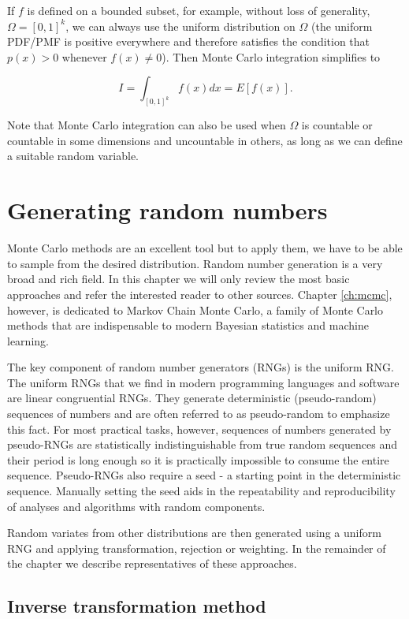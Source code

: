 \documentclass{book}
\theoremstyle{plain}%
\theoremstyle{definition}
\begin{document}
If $f$ is defined on a bounded subset, for example, without loss of generality, $\Omega = [0,1]^k$, we can always use the uniform distribution on $\Omega$ (the uniform PDF/PMF is positive everywhere and therefore satisfies the condition that $p(x) > 0$ whenever $f(x) \neq 0$). Then Monte Carlo integration simplifies to

$$I = \int_{[0,1]^k} f(x) dx = E[f(x)].$$

Note that Monte Carlo integration can also be used when $\Omega$ is countable or countable in some dimensions and uncountable in others, as long as we can define a suitable random variable.

\section{Generating random numbers}\label{sec:rng}

Monte Carlo methods are an excellent tool but to apply them, we have to be able to sample from the desired distribution. Random number generation is a very broad and rich field. In this chapter we will only review the most basic approaches and refer the interested reader to other sources. Chapter \ref{ch:mcmc}, however,  is dedicated to Markov Chain Monte Carlo, a family of Monte Carlo methods that are indispensable to modern Bayesian statistics and machine learning.

The key component of random number generators (RNGs) is the uniform RNG. The uniform RNGs that we find in modern programming languages and software are linear congruential RNGs. They generate deterministic (pseudo-random) sequences of numbers and are often referred to as pseudo-random to emphasize this fact. For most practical tasks, however, sequences of numbers generated by pseudo-RNGs are statistically indistinguishable from true random sequences and their period is long enough so it is practically impossible to consume the entire sequence. Pseudo-RNGs also require a seed - a starting point in the deterministic sequence. Manually setting the seed aids in the repeatability and reproducibility of analyses and algorithms with random components.

Random variates from other distributions are then generated using a uniform RNG and applying transformation, rejection or weighting. In the remainder of the chapter we describe representatives of these approaches.

\subsection*{Inverse transformation method}
\end{document}
